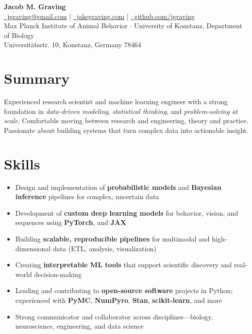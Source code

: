 \documentclass[10pt,letterpaper]{article}
\begin{document}
	
\begin{center}
	{\huge \textbf{Jacob M. Graving}}\\[6pt]
	\href{mailto:jgraving@gmail.com}{\faEnvelope\ jgraving@gmail.com}
	\quad | \quad
	\href{http://jakegraving.com/}{\faGlobe\ jakegraving.com}
	\quad | \quad
	\href{https://github.com/jgraving}{\faGithub\ github.com/jgraving}\\[8pt]
	
	{\small
		Max Planck Institute of Animal Behavior \quad $\cdot$ \quad
		University of Konstanz, Department of Biology \\
		Universit\"{a}tsstr. 10, Konstanz, Germany 78464
	}
\end{center}

\section*{Summary}
Experienced research scientist and machine learning engineer with a strong foundation in \textit{data-driven modeling}, \textit{statistical thinking}, and \textit{problem-solving at scale}. Comfortable moving between research and engineering, theory and practice. Passionate about building systems that turn complex data into actionable insight.

\section*{Skills}
\begin{itemize}
	\item Design and implementation of \textbf{probabilistic models} and \textbf{Bayesian inference} pipelines for complex, uncertain data
	\item Development of \textbf{custom deep learning models} for behavior, vision, and sequences using \textbf{PyTorch}, and \textbf{JAX}
	\item Building \textbf{scalable, reproducible pipelines} for multimodal and high-dimensional data (ETL, analysis, visualization)
	\item Creating \textbf{interpretable ML tools} that support scientific discovery and real-world decision-making
	\item Leading and contributing to \textbf{open-source software} projects in Python; experienced with \textbf{PyMC}, \textbf{NumPyro}, \textbf{Stan}, \textbf{scikit-learn}, and more
	\item Strong communicator and collaborator across disciplines—biology, neuroscience, engineering, and data science
\end{itemize}
\end{document}
